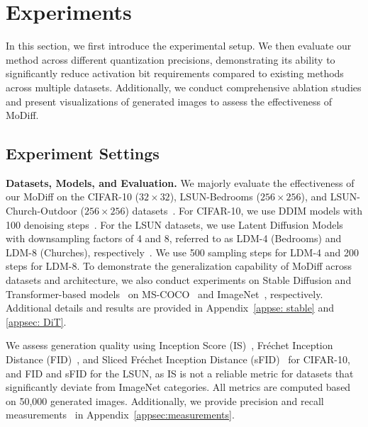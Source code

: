 \section{Experiments}
\label{sec:experiments}
In this section, we first introduce the experimental setup. We then evaluate our method across different quantization precisions, demonstrating its ability to significantly reduce activation bit requirements compared to existing methods across multiple datasets. Additionally, we conduct comprehensive ablation studies and present visualizations of generated images to assess the effectiveness of MoDiff.

\subsection{Experiment Settings}
\label{subsec:setting}
\textbf{Datasets, Models, and Evaluation.} We majorly evaluate the effectiveness of our MoDiff on the CIFAR-10 (\(32 \times 32\)), LSUN-Bedrooms (\(256 \times 256\)), and LSUN-Church-Outdoor (\(256 \times 256\)) datasets~\citep{krizhevsky2009learning, yu15lsun}. For CIFAR-10, we use DDIM models with 100 denoising steps~\citep{song2020denoising}. For the LSUN datasets, we use Latent Diffusion Models with downsampling factors of 4 and 8, referred to as LDM-4 (Bedrooms) and LDM-8 (Churches), respectively~\citep{rombach2022high}. We use 500 sampling steps for LDM-4 and 200 steps for LDM-8. To demonstrate the generalization capability of MoDiff across datasets and architecture, we also conduct experiments on Stable Diffusion and Transformer-based models~\citep{peebles2023scalable} on MS-COCO~\citep{lin2014microsoft} and ImageNet~\citep{ILSVRC15}, respectively. Additional details and results are provided in Appendix~\ref{appse: stable} and \ref{appsec: DiT}.

We assess generation quality using Inception Score (IS)~\citep{salimans2016improved}, Fr\'echet Inception Distance (FID)~\citep{heusel2017gans}, and Sliced Fr\'echet Inception Distance (sFID)~\citep{salimans2016improved} for CIFAR-10, and FID and sFID for the LSUN, as IS is not a reliable metric for datasets that significantly deviate from ImageNet categories. All metrics are computed based on 50,000 generated images. Additionally, we provide precision and recall measurements~\citep{sajjadi2018assessing} in Appendix~\ref{appsec:measurements}.  

